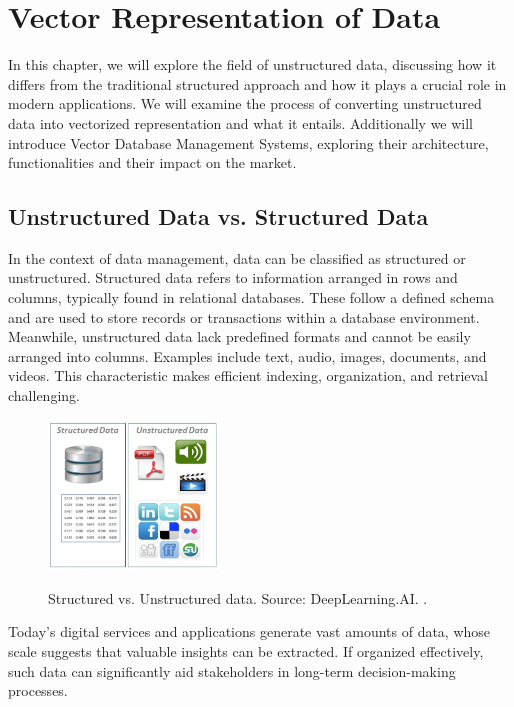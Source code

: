\pagestyle{fancy}
\chapter{Vector Representation of Data}
\label{chap:first_chapter}

In this chapter, we will explore the field of unstructured data, discussing how it differs from the traditional structured approach and how it plays a crucial role in modern applications. We will examine the process of converting unstructured data into vectorized representation and what it entails. Additionally we will introduce Vector Database Management Systems, exploring their architecture, functionalities and their impact on the market.

\section{Unstructured Data vs. Structured Data}
In the context of data management, data can be classified as structured or unstructured. Structured data refers to information arranged in rows and columns, typically found in relational databases. These follow a defined schema and are used to store records or transactions within a database environment. Meanwhile, unstructured data lack predefined formats and cannot be easily arranged into columns. Examples include text, audio, images, documents, and videos. This characteristic makes efficient indexing, organization, and retrieval challenging.
\begin{figure}[h]
    \centering
    \includegraphics[width=0.4\textwidth]{IMAGES/immagine_2025-02-24_091828425.png}
    \label{fig:Structured vs. Unstructured data}
    \caption[Structured vs. Unstructured data.]{Structured vs. Unstructured data. Source: DeepLearning.AI. \footnotemark.}
    \label{fig:structuredVunstruct}
\end{figure}

Today’s digital services and applications generate vast amounts of data, whose scale suggests that valuable insights can be extracted. If organized effectively, such data can significantly aid stakeholders in long-term decision-making processes.

